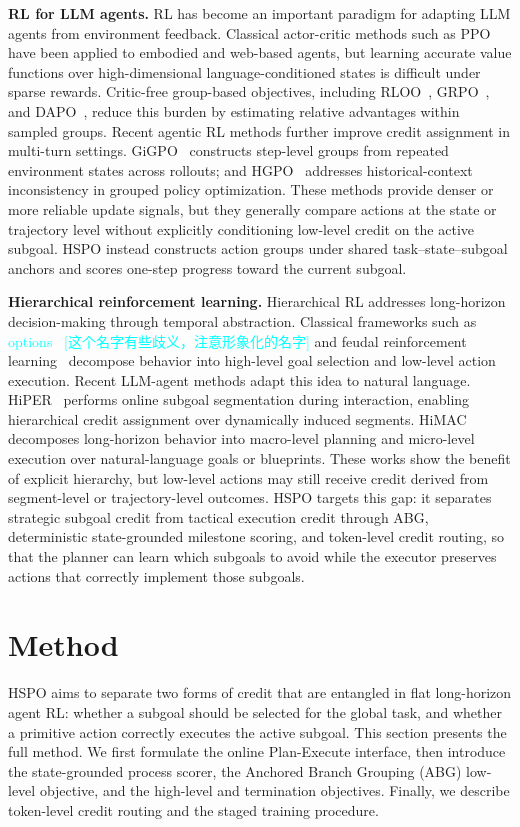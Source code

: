 \documentclass{article}
\newcommand{\gx}[1]{\textcolor{cyan}{#1}}
\newcommand{\wei}[1]{\textcolor{red}{#1}}
\begin{document}
\textbf{RL for LLM agents.}
RL has become an important paradigm for adapting LLM agents from environment feedback. Classical actor-critic methods such as PPO~\cite{schulman2017ppo} have been applied to embodied and web-based agents, but learning accurate value functions over high-dimensional language-conditioned states is difficult under sparse rewards. Critic-free group-based objectives, including RLOO~\cite{ahmadian2024back}, GRPO~\cite{shao2024deepseekmath}, and DAPO~\cite{yu2025dapo}, reduce this burden by estimating relative advantages within sampled groups. Recent agentic RL methods further improve credit assignment in multi-turn settings. GiGPO~\cite{gigpo} constructs step-level groups from repeated environment states across rollouts; and HGPO~\cite{hgpo} addresses historical-context inconsistency in grouped policy optimization. These methods provide denser or more reliable update signals, but they generally compare actions at the state or trajectory level without explicitly conditioning low-level credit on the active subgoal. HSPO instead constructs action groups under shared task--state--subgoal anchors and scores one-step progress toward the current subgoal.

\textbf{Hierarchical reinforcement learning.}
Hierarchical RL addresses long-horizon decision-making through temporal abstraction. Classical frameworks such as \gx{options~\cite{sutton1999between} [这个名字有些歧义，注意形象化的名字]} and feudal reinforcement learning~\cite{vezhnevets2017feudal} decompose behavior into high-level goal selection and low-level action execution. Recent LLM-agent methods adapt this idea to natural language. HiPER~\cite{hiper} performs online subgoal segmentation during interaction, enabling hierarchical credit assignment over dynamically induced segments. HiMAC~\cite{himac} decomposes long-horizon behavior into macro-level planning and micro-level execution over natural-language goals or blueprints. These works show the benefit of explicit hierarchy, but low-level actions may still receive credit derived from segment-level or trajectory-level outcomes. HSPO targets this gap: it separates strategic subgoal credit from tactical execution credit through ABG, deterministic state-grounded milestone scoring, and token-level credit routing, so that the planner can learn which subgoals to avoid while the executor preserves actions that correctly implement those subgoals.


\section{Method}
\label{sec:method}
HSPO aims to separate two forms of credit that are entangled in flat long-horizon agent RL: whether a subgoal should be selected for the global task, and whether a primitive action correctly executes the active subgoal. This section presents the full method. We first formulate the online Plan-Execute interface, then introduce the state-grounded process scorer, the Anchored Branch Grouping (ABG) low-level objective, and the high-level and termination objectives. Finally, we describe token-level credit routing and the staged training procedure.  %
\end{document}

